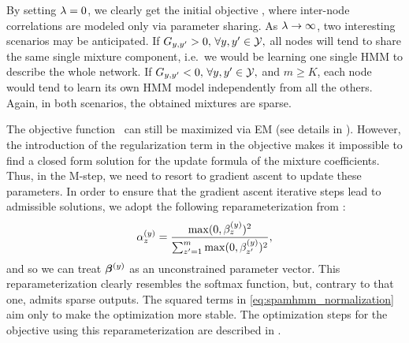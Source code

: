 By setting $\lambda=0$, we clearly get the initial objective , where inter-node correlations are modeled only via parameter sharing. As $\lambda \to \infty$, two interesting scenarios may be anticipated. If ${G}_{y,y'} > 0, \, \forall y,y' \in {\mathcal{Y}},$ all nodes will tend to share the same single mixture component, i.e.\ we would be learning one single HMM to describe the whole network. If ${G}_{y,y'} < 0, \, \forall y,y' \in {\mathcal{Y}},$ and $m \geq K$, each node would tend to learn its own HMM model independently from all the others. Again, in both scenarios, the obtained mixtures are sparse.

The objective function~ can still be maximized via EM (see details in ). However, the introduction of the regularization term in the objective makes it impossible to find a closed form solution for the update formula of the mixture coefficients. Thus, in the M-step, we need to resort to gradient ascent to update these parameters. In order to ensure that the gradient ascent iterative steps lead to admissible solutions, we adopt the following reparameterization from \citet{Yang2018}:
\begin{equation}
    \label{eq:spamhmm_normalization}
    {\alpha}^{(y)}_{z} = \frac{\max(0, {\beta^{(y)}_z})^2}{\sum_{z'=1}^m \max(0, {\beta^{(y)}_{z'}})^2},
\end{equation}
and so we can treat ${\bm{\beta}}^{(y)}$ as an unconstrained parameter vector. This reparameterization clearly resembles the softmax function, but, contrary to that one, admits sparse outputs. The squared terms in \eqref{eq:spamhmm_normalization} aim only to make the optimization more stable. The optimization steps for the objective  using this reparameterization are described in .

